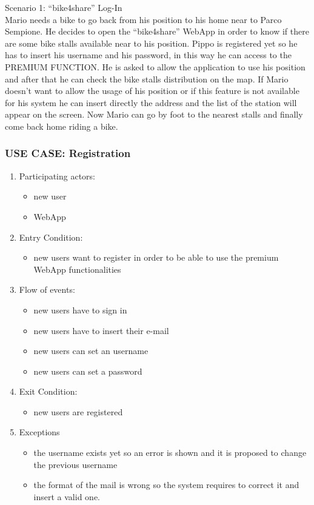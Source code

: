 \documentclass{article}
\begin{document}
Scenario 1: “bike4share” Log-In \\
Mario needs a bike to go back from his position to his home near to Parco Sempione. He decides to open the “bike4share” WebApp in order to know if there are some bike stalls available near to his position. 
Pippo is registered yet so he has to insert his username and his password, in this way he can access to the PREMIUM FUNCTION. 
He is asked to allow the application to use his position and after that he can check the bike stalls distribution on the map. 
If Mario doesn’t want to allow the usage of his position or if this feature is not available for his system he can insert directly the address and the list of the station will appear on the screen. Now Mario can go by foot to the nearest stalls and finally come back home riding a bike.

\subsubsection{\textbf{USE CASE}: Registration}
\begin{enumerate}
\item Participating actors: 
\begin{itemize}
    \item new user
    \item WebApp
\end{itemize}
\item Entry Condition: 
\begin{itemize}
    \item new users want to register in order to be able to use the premium WebApp functionalities
\end{itemize}
\item Flow of events: 
\begin{itemize}
    \item new users have to sign in
    \item new users have to insert their e-mail
    \item new users can set an username
    \item new users can set a password
\end{itemize}
\item Exit Condition: 
\begin{itemize}
    \item new users are registered
\end{itemize}
\item Exceptions
\begin{itemize}
    \item the username exists yet so an error is shown and it is proposed to change the previous username
    \item the format of the mail is wrong so the system requires to correct it and insert a valid one.
\end{itemize}
\end{enumerate}
\end{document}
